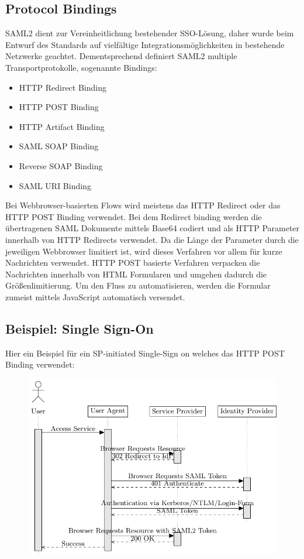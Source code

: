 \subsection{Protocol Bindings}

SAML2 dient zur Vereinheitlichung bestehender SSO-Lösung, daher wurde beim Entwurf des Standards auf vielfältige Integrationsmöglichkeiten in bestehende Netzwerke geachtet. Dementsprechend definiert SAML2 multiple Transportprotokolle, sogenannte Bindings:

\begin{itemize}
	\item HTTP Redirect Binding
	\item HTTP POST Binding
	\item HTTP Artifact Binding
	\item SAML SOAP Binding
	\item Reverse SOAP Binding
	\item SAML URI Binding
\end{itemize}

Bei Webbrowser-basierten Flows wird meistens das HTTP Redirect oder das HTTP POST Binding verwendet. Bei dem Redirect binding werden die übertragenen SAML Dokumente mittels Base64 codiert und als HTTP Parameter innerhalb von HTTP Redirects verwendet. Da die Länge der Parameter durch die jeweiligen Webbrowser limitiert ist, wird dieses Verfahren vor allem für kurze Nachrichten verwendet. HTTP POST basierte Verfahren verpacken die Nachrichten innerhalb von HTML Formularen und umgehen dadurch die Größenlimitierung. Um den Fluss zu automatisieren, werden die Formular zumeist mittels JavaScript automatisch versendet.

\subsection{Beispiel: Single Sign-On}

Hier ein Beispiel für ein SP-initiated Single-Sign on welches das HTTP POST Binding verwendet:

\begin{figure}[h!]
	\includegraphics[width=\textwidth]{graphs/saml2.pdf}
	\centering
\end{figure}

